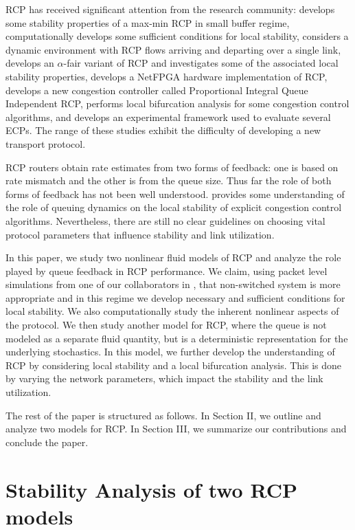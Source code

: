 \documentclass[conference]{IEEEtran}
\begin{document}
RCP has received significant attention from the research community: \cite{vr} develops some stability properties 
of a  max-min RCP in small buffer regime, \cite{nanswitch} computationally develops some sufficient 
conditions for local stability, \cite{bufferrcp} considers a dynamic environment with RCP flows arriving 
and departing over a single link, \cite{krv} develops an $\alpha$-fair variant of RCP and investigates 
some of the associated local stability properties, \cite{netfpga} develops a NetFPGA hardware 
implementation of RCP, \cite{piqi} develops a new congestion controller called Proportional Integral Queue Independent RCP,  \cite{gra} performs local bifurcation analysis for some congestion control algorithms, and \cite{zhang} develops an experimental framework used to evaluate several ECPs.  The range of these studies exhibit the difficulty 
of developing a new transport protocol.

RCP routers obtain rate estimates from two forms of feedback: one is based on rate 
mismatch and the other is from the queue size. Thus far the role of both forms of feedback has 
not been well understood. \cite{nanswitch} provides some understanding of the role of queuing dynamics
on the local stability of explicit congestion control algorithms. Nevertheless, there are still no
clear guidelines on choosing vital protocol parameters that influence 
 stability and link utilization.

In this paper, we study two nonlinear fluid models of RCP and analyze the role played by queue feedback
in RCP performance. We claim, using packet level simulations from one of our collaborators in \cite{krv}, that non-switched system is more 
appropriate and in this regime we develop necessary and sufficient conditions for local stability. 
We also computationally study the inherent nonlinear aspects of the protocol.
We then study another model for RCP, where the queue is not modeled as 
a separate fluid quantity, but is a deterministic representation for the underlying stochastics. In this model, 
we further develop the understanding of RCP by considering local stability and a local bifurcation analysis. 
This is done by varying the network parameters, which impact the stability and the link utilization. 

The rest of the paper is structured as follows. In Section II, we outline and analyze two models 
for RCP. In Section III, we summarize our contributions and conclude the paper.

\section{Stability Analysis of two RCP models}
\end{document}
